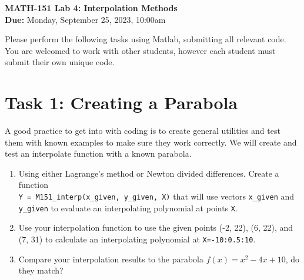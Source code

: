 \documentclass[11pt]{article}
\begin{document}
	
	\begin{center}
		\Large{\textbf{MATH-151 Lab 4: Interpolation Methods}}\\
			\medskip
		\normalsize{\textbf{Due:} Monday, September 25, 2023, 10:00am} 
	\end{center}
	\noindent\makebox[\linewidth]{\rule{\textwidth}{0.4pt}}
	Please perform the following tasks using Matlab, submitting all relevant code. You are welcomed to work with other students, however each student must submit their own unique code.
	\section*{Task 1: Creating a Parabola}
	\noindent A good practice to get into with coding is to create general utilities and test them with known examples to make sure they work correctly. We will create and test an interpolate function with a known parabola. 
	\begin{enumerate}[label=\alph*)]
		\item Using either Lagrange's method or Newton divided differences. Create a function\\
		 \texttt{Y = M151\_interp(x\_given, y\_given, X)} that will use vectors \texttt{x\_given} and \texttt{y\_given} to evaluate an interpolating polynomial at points \texttt{X}.
		\item Use your interpolation function to use the given points (-2, 22), (6, 22), and (7, 31) to calculate an interpolating polynomial at \texttt{X=-10:0.5:10}.
		\item Compare your interpolation results to the parabola $f(x) = x^2 -4x + 10$, do they match?
	\end{enumerate}
\end{document}
